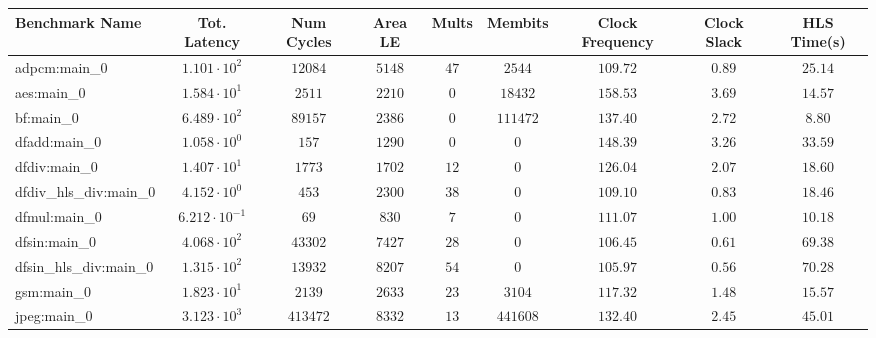 \begin{tabular}{|l|c|c|c|c|c|c|c|c|}
\hline
Benchmark Name          & Tot. Latency            & Num Cycles & Area LE   & Mults   & Membits    & Clock Frequency & Clock Slack & HLS Time(s) \\
\hline
adpcm:main\_0           & $ 1.101 \cdot 10^{2}  $ & $ 12084  $ & $ 5148  $ & $ 47  $ & $ 2544   $ & $ 109.72      $ & $ 0.89    $ & $ 25.14   $ \\
aes:main\_0             & $ 1.584 \cdot 10^{1}  $ & $ 2511   $ & $ 2210  $ & $ 0   $ & $ 18432  $ & $ 158.53      $ & $ 3.69    $ & $ 14.57   $ \\
bf:main\_0              & $ 6.489 \cdot 10^{2}  $ & $ 89157  $ & $ 2386  $ & $ 0   $ & $ 111472 $ & $ 137.40      $ & $ 2.72    $ & $ 8.80    $ \\
dfadd:main\_0           & $ 1.058 \cdot 10^{0}  $ & $ 157    $ & $ 1290  $ & $ 0   $ & $ 0      $ & $ 148.39      $ & $ 3.26    $ & $ 33.59   $ \\
dfdiv:main\_0           & $ 1.407 \cdot 10^{1}  $ & $ 1773   $ & $ 1702  $ & $ 12  $ & $ 0      $ & $ 126.04      $ & $ 2.07    $ & $ 18.60   $ \\
dfdiv\_hls\_div:main\_0 & $ 4.152 \cdot 10^{0}  $ & $ 453    $ & $ 2300  $ & $ 38  $ & $ 0      $ & $ 109.10      $ & $ 0.83    $ & $ 18.46   $ \\
dfmul:main\_0           & $ 6.212 \cdot 10^{-1} $ & $ 69     $ & $ 830   $ & $ 7   $ & $ 0      $ & $ 111.07      $ & $ 1.00    $ & $ 10.18   $ \\
dfsin:main\_0           & $ 4.068 \cdot 10^{2}  $ & $ 43302  $ & $ 7427  $ & $ 28  $ & $ 0      $ & $ 106.45      $ & $ 0.61    $ & $ 69.38   $ \\
dfsin\_hls\_div:main\_0 & $ 1.315 \cdot 10^{2}  $ & $ 13932  $ & $ 8207  $ & $ 54  $ & $ 0      $ & $ 105.97      $ & $ 0.56    $ & $ 70.28   $ \\
gsm:main\_0             & $ 1.823 \cdot 10^{1}  $ & $ 2139   $ & $ 2633  $ & $ 23  $ & $ 3104   $ & $ 117.32      $ & $ 1.48    $ & $ 15.57   $ \\
jpeg:main\_0            & $ 3.123 \cdot 10^{3}  $ & $ 413472 $ & $ 8332  $ & $ 13  $ & $ 441608 $ & $ 132.40      $ & $ 2.45    $ & $ 45.01   $ \\

\end{tabular}
